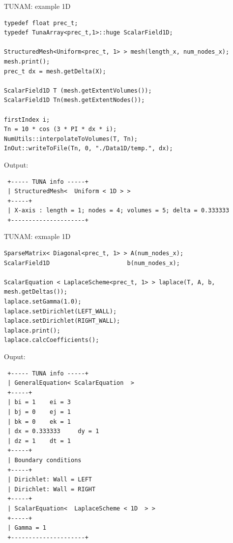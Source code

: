 \documentclass[handout]{beamer}
\begin{document}
\begin{frame}[fragile]{TUNAM: example 1D}


\begin{tiny}
\begin{lstlisting}
typedef float prec_t;
typedef TunaArray<prec_t,1>::huge ScalarField1D;

StructuredMesh<Uniform<prec_t, 1> > mesh(length_x, num_nodes_x);
mesh.print();
prec_t dx = mesh.getDelta(X);

ScalarField1D T (mesh.getExtentVolumes());
ScalarField1D Tn(mesh.getExtentNodes());
    
firstIndex i;
Tn = 10 * cos (3 * PI * dx * i);
NumUtils::interpolateToVolumes(T, Tn);
InOut::writeToFile(Tn, 0, "./Data1D/temp.", dx);        
\end{lstlisting}

Output:

\begin{verbatim}
 +----- TUNA info -----+
 | StructuredMesh<  Uniform < 1D > >
 +-----+
 | X-axis : length = 1; nodes = 4; volumes = 5; delta = 0.333333
 +---------------------+
\end{verbatim}
\end{tiny}


\end{frame}

\begin{frame}[fragile]{TUNAM: exmaple 1D}

\begin{tiny}
\begin{lstlisting}
SparseMatrix< Diagonal<prec_t, 1> > A(num_nodes_x); 
ScalarField1D                      b(num_nodes_x); 

ScalarEquation < LaplaceScheme<prec_t, 1> > laplace(T, A, b, mesh.getDeltas());
laplace.setGamma(1.0);
laplace.setDirichlet(LEFT_WALL);
laplace.setDirichlet(RIGHT_WALL);
laplace.print();
laplace.calcCoefficients();
\end{lstlisting}

Ouput:

\begin{verbatim}
 +----- TUNA info -----+
 | GeneralEquation< ScalarEquation  > 
 +-----+
 | bi = 1	 ei = 3
 | bj = 0	 ej = 1
 | bk = 0	 ek = 1
 | dx = 0.333333	 dy = 1
 | dz = 1	 dt = 1
 +-----+
 | Boundary conditions 
 +-----+
 | Dirichlet: Wall = LEFT
 | Dirichlet: Wall = RIGHT
 +-----+
 | ScalarEquation<  LaplaceScheme < 1D  > >
 +-----+
 | Gamma = 1
 +---------------------+
\end{verbatim}
\end{tiny}


\end{frame}
\end{document}

